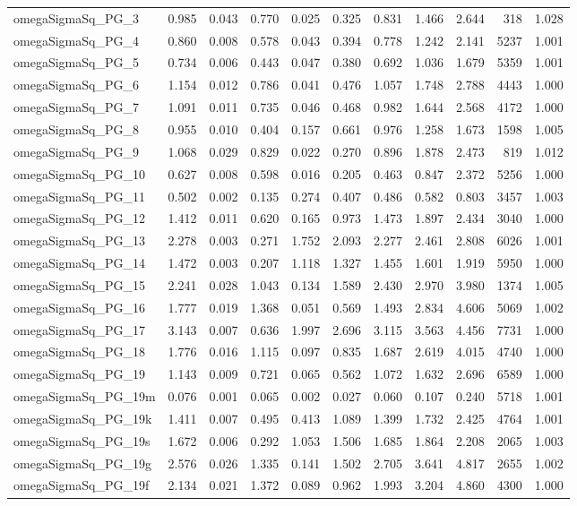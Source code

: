 \documentclass[12pt]{article}
\begin{document}
\begin{longtable}{lrrrrrrrrrr}
omegaSigmaSq\_PG\_3   & 0.985 & 0.043 & 0.770 & 0.025 & 0.325 & 0.831 & 1.466 & 2.644 &   318 & 1.028 \\
omegaSigmaSq\_PG\_4   & 0.860 & 0.008 & 0.578 & 0.043 & 0.394 & 0.778 & 1.242 & 2.141 &  5237 & 1.001 \\
omegaSigmaSq\_PG\_5   & 0.734 & 0.006 & 0.443 & 0.047 & 0.380 & 0.692 & 1.036 & 1.679 &  5359 & 1.001 \\
omegaSigmaSq\_PG\_6   & 1.154 & 0.012 & 0.786 & 0.041 & 0.476 & 1.057 & 1.748 & 2.788 &  4443 & 1.000 \\
omegaSigmaSq\_PG\_7   & 1.091 & 0.011 & 0.735 & 0.046 & 0.468 & 0.982 & 1.644 & 2.568 &  4172 & 1.000 \\
omegaSigmaSq\_PG\_8   & 0.955 & 0.010 & 0.404 & 0.157 & 0.661 & 0.976 & 1.258 & 1.673 &  1598 & 1.005 \\
omegaSigmaSq\_PG\_9   & 1.068 & 0.029 & 0.829 & 0.022 & 0.270 & 0.896 & 1.878 & 2.473 &   819 & 1.012 \\
omegaSigmaSq\_PG\_10  & 0.627 & 0.008 & 0.598 & 0.016 & 0.205 & 0.463 & 0.847 & 2.372 &  5256 & 1.000 \\
omegaSigmaSq\_PG\_11  & 0.502 & 0.002 & 0.135 & 0.274 & 0.407 & 0.486 & 0.582 & 0.803 &  3457 & 1.003 \\
omegaSigmaSq\_PG\_12  & 1.412 & 0.011 & 0.620 & 0.165 & 0.973 & 1.473 & 1.897 & 2.434 &  3040 & 1.000 \\
omegaSigmaSq\_PG\_13  & 2.278 & 0.003 & 0.271 & 1.752 & 2.093 & 2.277 & 2.461 & 2.808 &  6026 & 1.001 \\
omegaSigmaSq\_PG\_14  & 1.472 & 0.003 & 0.207 & 1.118 & 1.327 & 1.455 & 1.601 & 1.919 &  5950 & 1.000 \\
omegaSigmaSq\_PG\_15  & 2.241 & 0.028 & 1.043 & 0.134 & 1.589 & 2.430 & 2.970 & 3.980 &  1374 & 1.005 \\
omegaSigmaSq\_PG\_16  & 1.777 & 0.019 & 1.368 & 0.051 & 0.569 & 1.493 & 2.834 & 4.606 &  5069 & 1.002 \\
omegaSigmaSq\_PG\_17  & 3.143 & 0.007 & 0.636 & 1.997 & 2.696 & 3.115 & 3.563 & 4.456 &  7731 & 1.000 \\
omegaSigmaSq\_PG\_18  & 1.776 & 0.016 & 1.115 & 0.097 & 0.835 & 1.687 & 2.619 & 4.015 &  4740 & 1.000 \\
omegaSigmaSq\_PG\_19  & 1.143 & 0.009 & 0.721 & 0.065 & 0.562 & 1.072 & 1.632 & 2.696 &  6589 & 1.000 \\
omegaSigmaSq\_PG\_19m & 0.076 & 0.001 & 0.065 & 0.002 & 0.027 & 0.060 & 0.107 & 0.240 &  5718 & 1.001 \\
omegaSigmaSq\_PG\_19k & 1.411 & 0.007 & 0.495 & 0.413 & 1.089 & 1.399 & 1.732 & 2.425 &  4764 & 1.001 \\
omegaSigmaSq\_PG\_19s & 1.672 & 0.006 & 0.292 & 1.053 & 1.506 & 1.685 & 1.864 & 2.208 &  2065 & 1.003 \\
omegaSigmaSq\_PG\_19g & 2.576 & 0.026 & 1.335 & 0.141 & 1.502 & 2.705 & 3.641 & 4.817 &  2655 & 1.002 \\
omegaSigmaSq\_PG\_19f & 2.134 & 0.021 & 1.372 & 0.089 & 0.962 & 1.993 & 3.204 & 4.860 &  4300 & 1.000 \\
\end{longtable}
\endgroup
\end{document}
